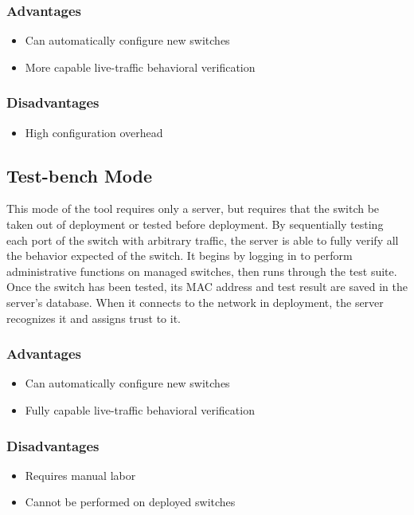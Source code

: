 \documentclass[journal]{IEEEtran}
\begin{document}
\subsubsection{Advantages}
\begin{itemize}
	\item Can automatically configure new switches
	\item More capable live-traffic behavioral verification
\end{itemize}
\subsubsection{Disadvantages}
\begin{itemize}
	\item High configuration overhead
\end{itemize}

\subsection{Test-bench Mode}
This mode of the tool requires only a server, but requires that the switch be taken out of
deployment or tested before deployment. By sequentially testing each port of the switch with
arbitrary traffic, the server is
able to fully verify all the behavior expected of the switch. It begins by logging in to perform
administrative functions on managed switches, then runs through the test suite. Once the switch has
been tested, its MAC address and test result are saved in the server's database. When it connects to
the network in deployment, the server recognizes it and assigns trust to it.
\subsubsection{Advantages}
\begin{itemize}
	\item Can automatically configure new switches
	\item Fully capable live-traffic behavioral verification
\end{itemize}
\subsubsection{Disadvantages}
\begin{itemize}
	\item Requires manual labor
	\item Cannot be performed on deployed switches
\end{itemize}
\end{document}

